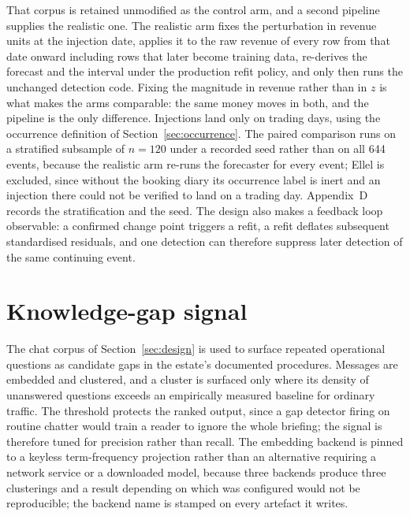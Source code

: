 That corpus is retained unmodified as the control arm, and a second pipeline supplies the
realistic one. The realistic arm fixes the perturbation in revenue units at the injection date,
applies it to the
raw revenue of every row from that date onward including rows that later become training data,
re-derives the forecast and the interval under the production refit policy, and only then runs the
unchanged detection code. Fixing the magnitude in revenue rather than in $z$ is what makes the
arms comparable: the same money moves in both, and the pipeline is the only difference. Injections
land only on trading days, using the occurrence definition of Section~\ref{sec:occurrence}. The
paired comparison runs on a stratified subsample of $n = 120$ under a recorded seed rather than on
all 644 events, because the realistic arm re-runs the forecaster for every event; Ellel is
excluded, since without the booking diary its occurrence label is inert and an injection there
could not be verified to land on a trading day. Appendix~D records the stratification and the
seed. The design also makes a feedback loop observable: a confirmed change point triggers a refit,
a refit deflates subsequent standardised residuals, and one detection can therefore suppress later
detection of the same continuing event.

\section{Knowledge-gap signal}
\label{sec:chatlog}

The chat corpus of Section~\ref{sec:design} is used to surface repeated operational questions as
candidate gaps in the estate's documented procedures. Messages are embedded and clustered, and a
cluster is surfaced only where its density of unanswered questions exceeds an empirically measured
baseline for ordinary traffic. The threshold protects the ranked output, since a gap detector
firing on routine chatter would train a reader to ignore the whole briefing; the signal is
therefore tuned for precision rather than recall. The embedding backend is pinned to a keyless
term-frequency projection rather than an alternative requiring a network service or a downloaded
model, because three backends produce three clusterings and a result depending on which was
configured would not be reproducible; the backend name is stamped on every artefact it writes.

